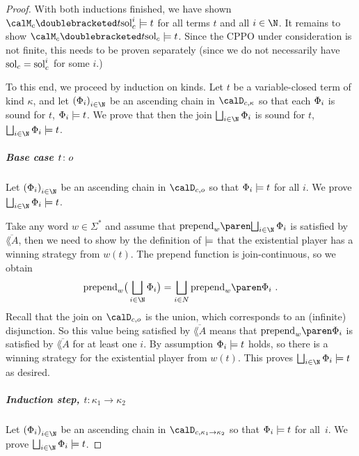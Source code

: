 \documentclass[../../diss.tex]{subfiles}
\begin{document}
\begin{proof}
        With both inductions finished, we have shown $\semc{t}{\solc^i} \gamesound t$ for all terms $t$ and all $i \in \N$.
        It remains to show $\semc{t}{\solc} \gamesound t$.
        Since the CPPO under consideration is not finite, this needs to be proven separately (since we do not necessarily have $\solc = \solc^i$ for some $i$.)

        To this end, we proceed by induction on kinds.
        Let $t$ be a variable-closed term of kind $\kappa$, and let ${(\judgment_i)}_{i \in \N}$ be an ascending chain in $\domainc{\kappa}$ so that each $\Phi_i$ is sound for $t$, $\Phi_i \models t$.
        We prove that then the join $\bigsqcup_{i \in \N} \judgment_i$ is sound for $t$, $\bigsqcup_{i \in \N} \judgment_i \gamesound t$.

        \subparagraph{Base case $t \colon o$}

            Let ${(\judgment_i)}_{i \in \N}$ be an ascending chain in $\domainc{\ground}$ so that $\Phi_i \models t$ for all $i$.
            We prove
            $\bigsqcup_{i \in \N} \judgment_i \gamesound t$.

            Take any word $w \in \Sigma^*$ and assume that
            $\prepend{w}{\bigsqcup_{i \in \N} \judgment_i}$
            is satisfied by $\overline{\lang{A}}$, then we need to show by the definition of $\models$ that the existential player
            has a winning strategy from $w(t)$.
            The prepend function is join-continuous, so we obtain
            \[
                \prepend{w} \big( \bigsqcup_{i \in \N} \judgment_i \big)
                =
                \bigsqcup_{i \in N} \prepend{w}{\judgment_i}
                \ .
            \]
            Recall that the join on $\domainc{\ground}$ is the union, which corresponds to an (infinite) disjunction. So this value being satisfied by $\overline{\lang{A}}$ means that $\prepend{w}{\judgment_i}$ is satisfied by $\overline{\lang{A}}$ for at least one $i$.
            By assumption $\Phi_i \models t$ holds, so there is a winning strategy for the existential player from $w(t)$.
            This proves $\bigsqcup_{i \in \N} \judgment_i \gamesound t$ as desired.

        \subparagraph{Induction step, $t \colon \kappa_1 \to \kappa_2$}

            Let ${(\judgment_i)}_{i \in \N}$ be an ascending chain in $\domainc{\kappa_1 \to \kappa_2}$ so that $\Phi_i \models t$ for all~$i$.
            We prove
            $\bigsqcup_{i \in \N} \judgment_i \gamesound t$.


\end{proof}
\end{document}

